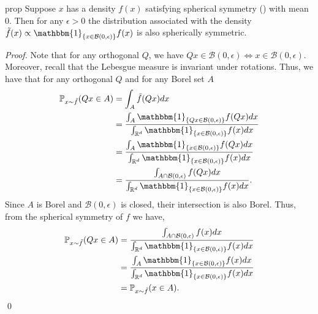\documentclass[11pt]{article}
\begin{document}
\begin{restatable}{prop}{} \label{prop: conditional spherical symmetry}
    Suppose $x$ has a density $f(x)$ satisfying spherical symmetry () with mean $0$. Then for any $\epsilon > 0$ the distribution associated with the density $\tilde{f}(x) \propto \mathbbm{1}_{\{x \in \mathcal{B}(0, \epsilon)\}}f(x)$ is also spherically symmetric. 
\end{restatable}
\noindent \textit{Proof.} Note that for any orthogonal $Q$, we have $Qx \in \mathcal{B}(0, \epsilon) \iff x \in \mathcal{B}(0, \epsilon)$. Moreover, recall that the Lebesgue measure is invariant under rotations. Thus, we have that for any orthogonal $Q$ and for any Borel set $A$
\begin{align*}
    \mathbb{P}_{x \sim \tilde f}(Qx \in A) &= \int_{A}\tilde{f}(Qx)dx \\
    &= \frac{\int_{A}\mathbbm{1}_{\{Qx \in \mathcal{B}(0,\epsilon)\}} f(Qx)dx}{\int_{\mathbb{R}^d}\mathbbm{1}_{\{x \in \mathcal{B}(0, \epsilon)\}}f(x) dx} \\
    &= \frac{\int_{A}\mathbbm{1}_{\{x \in \mathcal{B}(0,\epsilon)\}} f(Qx)dx}{\int_{\mathbb{R}^d}\mathbbm{1}_{\{x \in \mathcal{B}(0, \epsilon)\}}f(x) dx} \\
    &= \frac{\int_{A\cap \mathcal{B}(0, \epsilon)}f(Qx)dx}{\int_{\mathbb{R}^d}\mathbbm{1}_{\{x \in \mathcal{B}(0, \epsilon)\}}f(x) dx}.
\end{align*}
Since $A$ is Borel and $\mathcal{B}(0, \epsilon)$ is closed, their intersection is also Borel. Thus, from the spherical symmetry of $f$ we have,
\begin{align*}
    \mathbb{P}_{x \sim \tilde f}(Qx \in A) &= \frac{\int_{A\cap \mathcal{B}(0, \epsilon)}f(x)dx}{\int_{\mathbb{R}^d}\mathbbm{1}_{\{x \in \mathcal{B}(0, \epsilon)\}}f(x) dx} \\
    &= \frac{\int_{A}\mathbbm{1}_{\{x \in \mathcal{B}(0, \epsilon)\}}f(x)dx}{\int_{\mathbb{R}^d}\mathbbm{1}_{\{x \in \mathcal{B}(0, \epsilon)\}}f(x) dx} \\
    &= \mathbb{P}_{x \sim \tilde f}(x \in A).
\end{align*}
\qed{}
\end{document}
